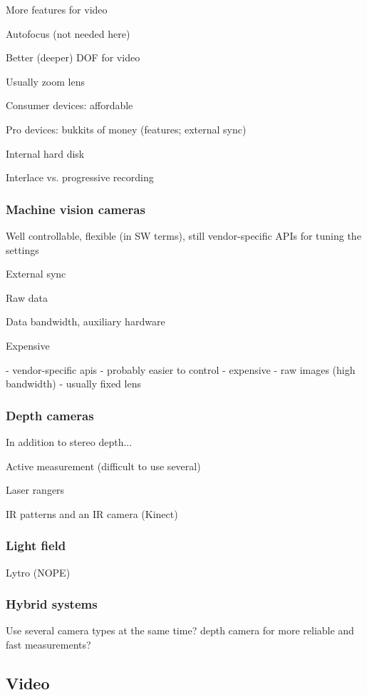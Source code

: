 More features for video

Autofocus (not needed here)

Better (deeper) DOF for video

Usually zoom lens

Consumer devices: affordable

Pro devices: bukkits of money (features; external sync)

Internal hard disk

Interlace vs. progressive recording

\subsubsection{Machine vision cameras}

Well controllable, flexible (in SW terms), still vendor-specific APIs for tuning the settings

External sync

Raw data

Data bandwidth, auxiliary hardware

Expensive

- vendor-specific apis
- probably easier to control
- expensive
- raw images (high bandwidth)
- usually fixed lens
\subsubsection{Depth cameras}

In addition to stereo depth...

Active measurement (difficult to use several)

Laser rangers

IR patterns and an IR camera (Kinect)

\subsubsection{Light field}

Lytro (NOPE)

\subsubsection{Hybrid systems}

Use several camera types at the same time? depth camera for more reliable and fast measurements?


\subsection{Video}

